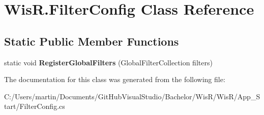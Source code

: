 \hypertarget{class_wis_r_1_1_filter_config}{}\section{Wis\+R.\+Filter\+Config Class Reference}
\label{class_wis_r_1_1_filter_config}
\subsection*{Static Public Member Functions}
\begin{DoxyCompactItemize}
\item 
\hypertarget{class_wis_r_1_1_filter_config_a00ae0f56c07b98425f3daecd8610ac40}{}static void {\bfseries Register\+Global\+Filters} (Global\+Filter\+Collection filters)\label{class_wis_r_1_1_filter_config_a00ae0f56c07b98425f3daecd8610ac40}

\end{DoxyCompactItemize}


The documentation for this class was generated from the following file\+:\begin{DoxyCompactItemize}
\item 
C\+:/\+Users/martin/\+Documents/\+Git\+Hub\+Visual\+Studio/\+Bachelor/\+Wis\+R/\+Wis\+R/\+App\+\_\+\+Start/Filter\+Config.\+cs\end{DoxyCompactItemize}
